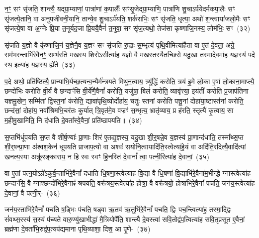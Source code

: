 न॒ꣳ॒ सꣳ सृ॑जति॒ शान्त्यै॒ यद्ग्रा॒म्याणां॒ पात्रा॑णां क॒पालैः᳚ सꣳसृ॒जेद्ग्रा॒म्याणि॒ पात्रा॑णि शु॒चा\-ऽर्प॑येदर्मकपा॒लैः सꣳ सृ॑जत्ये॒तानि॒ वा अ॑नुपजीवनी॒यानि॒ तान्ये॒व शु॒चा\-ऽर्प॑यति॒ शर्क॑राभिः॒ सꣳ सृ॑जति॒ धृत्या॒ अथो॑ श॒न्त्वाया॑जलो॒मैः सꣳ सृ॑जत्ये॒षा वा अ॒ग्नेः प्रि॒या त॒नूर्यद॒जा प्रि॒ययै॒वैनं॑ त॒नुवा॒ सꣳ सृ॑ज॒त्यथो॒ तेज॑सा कृष्णाजि॒नस्य॒ लोम॑भिः॒ सꣳ~(३२)\ip

सृ॑जति य॒ज्ञो वै कृ॑ष्णाजि॒नं य॒ज्ञेनै॒व य॒ज्ञꣳ सꣳ सृ॑जति रु॒द्राः स॒म्भृत्य॑ पृथि॒वीमित्या॑है॒ता वा ए॒तं दे॒वता॒ अग्रे॒ सम॑भर॒न्ताभि॑रे॒वैन॒ꣳ॒ सम्भ॑रति म॒खस्य॒ शिरो॒\-ऽसीत्या॑ह य॒ज्ञो वै म॒खस्तस्यै॒तच्छिरो॒ यदु॒खा तस्मा॑दे॒वमा॑ह य॒ज्ञस्य॑ प॒दे स्थ॒ इत्या॑ह य॒ज्ञस्य॒ ह्ये॑ते~(३३)\ip

प॒दे अथो॒ प्रति॑ष्ठित्यै॒ प्रान्याभि॒र्यच्छ॒त्यन्व॒न्यैर्म॑न्त्रयते मिथुन॒त्वाय॒ त्र्यु॑द्धिं करोति॒ त्रय॑ इ॒मे लो॒का ए॒षां लो॒काना॒माप्त्यै॒ छन्दो॑भिः करोति वी॒र्यं॑ वै छन्दाꣳ॑सि वी॒र्ये॑णै॒वैनां᳚ करोति॒ यजु॑षा॒ बिलं॑ करोति॒ व्यावृ॑त्त्या॒ इय॑तीं करोति प्र॒जा\-प॑तिना यज्ञमु॒खेन॒ सम्मि॑तां द्विस्त॒नां क॑रोति॒ द्यावा॑पृथि॒व्योर्दोहा॑य॒ चतुः॑ स्तनां करोति पशू॒नां दोहा॑या॒ष्टास्त॑नां करोति॒ छन्द॑सां॒ दोहा॑य॒ नवा᳚श्रिमभि॒चर॑तः कुर्यात् त्रि॒वृत॑मे॒व वज्रꣳ॑ स॒म्भृत्य॒ भ्रातृ॑व्याय॒ प्र ह॑रति॒ स्तृत्यै॑ कृ॒त्वाय॒ सा म॒हीमु॒खामिति॒ नि द॑धाति दे॒वता᳚स्वे॒वैनां॒ प्रति॑\-ष्ठापयति॥~(३४)\ip

{\anuvakamend[{तेनै॒व लोम॑भिः॒ समे॒ते अ॑भि॒चर॑त॒ एक॑विꣳशतिश्च}]}

स॒प्तभि॑र्धूपयति स॒प्त वै शी॑र्\mbox{}ष॒ण्याः᳚ प्रा॒णाः शिर॑ ए॒तद्य॒ज्ञस्य॒ यदु॒खा शी॒र्॒\mbox{}षन्ने॒व य॒ज्ञस्य॑ प्रा॒णान्द॑धाति॒ तस्मा᳚थ्स॒प्त शी॒र्॒\mbox{}षन्प्रा॒णा अ॑श्वश॒केन॑ धूपयति प्राजाप॒त्यो वा अश्वः॑ सयोनि॒त्वायादि॑ति॒स्त्वेत्या॑हे॒यं वा अदि॑ति॒रदि॑त्यै॒वादि॑त्यां खनत्य॒स्या अक्रू॑रङ्काराय॒ न हि स्वः स्वꣳ हि॒नस्ति॑ दे॒वानां᳚ त्वा॒ पत्नी॒रित्या॑ह दे॒वानां॒~(३५)\ip

वा ए॒तां पत्न॒यो\-ऽग्रे॑\-ऽकुर्व॒न्ताभि॑रे॒वैनां᳚ दधाति धि॒षणा॒स्त्वेत्या॑ह वि॒द्या वै धि॒षणा॑ वि॒द्याभि॑रे॒वैना॑म॒भीन्द्धे॒ ग्नास्त्वेत्या॑ह॒ छन्दाꣳ॑सि॒ वै ग्नाश्छन्दो॑भिरे॒वैनाꣴ॑ श्रपयति॒ वरू᳚त्रय॒स्त्वेत्या॑ह॒ होत्रा॒ वै वरू᳚त्रयो॒ होत्रा॑भिरे॒वैनां᳚ पचति॒ जन॑य॒स्त्वेत्या॑ह दे॒वानां॒ वै पत्नी॒र्-~(३६)\ip

जन॑य॒स्ताभि॑रे॒वैनां᳚ पचति ष॒ड्भिः प॑चति॒ षड्वा ऋ॒तव॑ ऋ॒तुभि॑रे॒वैनां᳚ पचति॒ द्विः पच॒न्त्वित्या॑ह॒ तस्मा॒द्द्विः सं॑वथ्स॒रस्य॑ स॒स्यं प॑च्यते वारु॒ण्यु॑खाभीद्धा॑ मै॒त्रियोपै॑ति॒ शान्त्यै॑ दे॒वस्त्वा॑ सवि॒तोद्व॑प॒त्वित्या॑ह सवि॒तृप्र॑सूत ए॒वैनां॒ ब्रह्म॑णा दे॒वता॑भि॒रुद्व॑प॒त्यप॑द्यमाना पृथि॒व्याशा॒ दिश॒ आ पृ॒णे-~(३७)\ip


